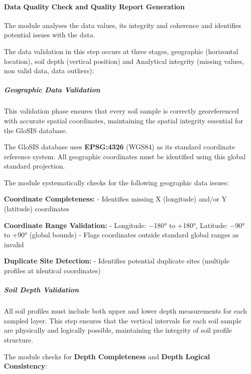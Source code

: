 \documentclass[
  10pt,
  b5paper,
  oneside]{book}
\begin{document}
\paragraph*{Data Quality Check and Quality Report Generation}\label{data-quality-check-and-quality-report-generation}

The module analyses the data values, its integrity and coherence and identifies potential issues with the data.

The data validation in this step occurs at three stages, geographic (horizontal location), soil depth (vertical position) and Analytical integrity (missing values, non valid data, data outliers):

\subparagraph*{Geographic Data Validation}\label{geographic-data-validation}

This validation phase ensures that every soil sample is correctly georeferenced with accurate spatial coordinates, maintaining the spatial integrity essential for the GloSIS database.

The GloSIS database uses \textbf{EPSG:4326} (WGS84) as its standard coordinate reference system. All geographic coordinates must be identified using this global standard projection.

The module systematically checks for the following geographic data issues:

\textbf{Coordinate Completeness:} - Identifies missing X (longitude) and/or Y (latitude) coordinates

\textbf{Coordinate Range Validation:} - Longitude: −180° to +180°, Latitude: −90° to +90° (global bounds) - Flags coordinates outside standard global ranges as invalid

\textbf{Duplicate Site Detection:} - Identifies potential duplicate sites (multiple profiles at identical coordinates)

\subparagraph*{Soil Depth Validation}\label{soil-depth-validation}

All soil profiles must include both upper and lower depth measurements for each sampled layer. This step ensures that the vertical intervals for each soil sample are physically and logically possible, maintaining the integrity of soil profile structure.

The module checks for \textbf{Depth Completeness} and \textbf{Depth Logical Consistency}:
\end{document}
